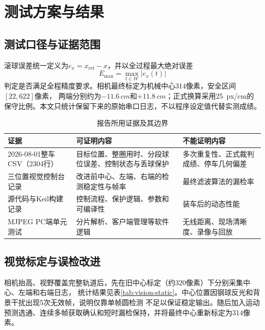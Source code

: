 \section{测试方案与结果}

\subsection{测试口径与证据范围}

滚球误差统一定义为$e_x=x_{\mathrm{ref}}-x$，并以全过程最大绝对误差
\begin{equation}
  E_{\max}=\max_{t\in\mathcal W}|e_x(t)|
  \label{eq:max-error}
\end{equation}
判定是否满足全程精度要求。相机最终标定为机械中心314像素，安全区间$[22,622]$像素，
两端分别约为$-11.6\,\si{cm}$和$+11.8\,\si{cm}$；正式换算采用\SI{25}{px/cm}的
保守比例。本文只统计保留下来的原始串口日志，不以程序设定值代替实测成绩。

\begin{table}[H]
  \centering
  \caption{报告所用证据及其边界}
  \label{tab:evidence}
  \small
  \begin{tabularx}{\linewidth}{p{3.2cm}Xp{3.1cm}}
    \toprule
    证据 & 可证明内容 & 不能证明内容 \\
    \midrule
    2026-08-01整车CSV（2304行） & 目标位置、整圈用时、分段球位误差、控制状态与丢球保护 & 多次重复性、正式裁判成绩、停车几何偏差 \\
    三位置视觉控制台记录 & 改进前中心、左端、右端的检测稳定性与帧率 & 最终滤波算法的漏检率 \\
    源代码与Keil构建记录 & 控制流程、保护逻辑、参数和可编译性 & 装车后的动态性能 \\
    MJPEG PC端单元测试 & 分片解析、客户端管理等软件逻辑 & 无线距离、现场清晰度、录像与回放 \\
    \bottomrule
  \end{tabularx}
\end{table}

\subsection{视觉标定与误检改进}

相机抬高、视野覆盖完整轨道后，先在旧中心标定（约320像素）下分别采集中心、左端和右端日志，
统计结果见表\ref{tab:vision-static}。中心位置因钢球反光和背景干扰出现5次无效帧，说明仅靠单帧圆检测
不足以保证稳定输出。随后加入运动预测选通、连续多帧获取确认和短时漏检保持，并将最终中心重新标定为314像素。

